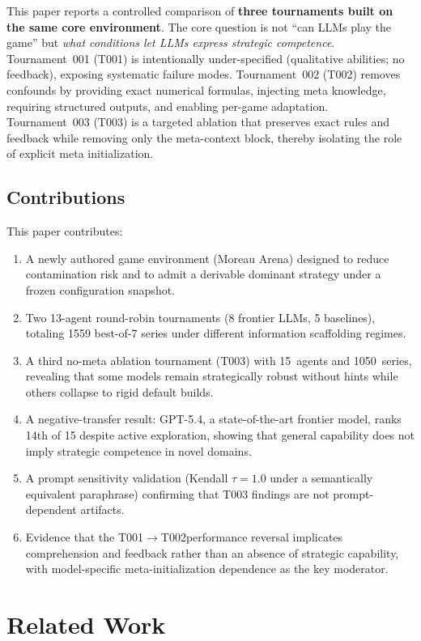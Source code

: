 \documentclass[11pt]{article}
\newcommand{\tOne}{T001}
\newcommand{\tTwo}{T002}
\newcommand{\tThree}{T003}
\begin{document}
This paper reports a controlled comparison of \textbf{three tournaments built on the same core environment}.
The core question is not ``can LLMs play the game'' but \emph{what conditions let LLMs express strategic competence}.
Tournament~001 (\tOne) is intentionally under-specified (qualitative abilities; no feedback), exposing systematic failure modes.
Tournament~002 (\tTwo) removes confounds by providing exact numerical formulas, injecting meta knowledge, requiring structured outputs, and enabling per-game adaptation.
Tournament~003 (\tThree) is a targeted ablation that preserves exact rules and feedback while removing only the meta-context block, thereby isolating the role of explicit meta initialization.

\subsection*{Contributions}

This paper contributes:
\begin{enumerate}[leftmargin=*]
\item A newly authored game environment (Moreau Arena) designed to reduce contamination risk and to admit a derivable dominant strategy under a frozen configuration snapshot.
\item Two 13-agent round-robin tournaments (8 frontier LLMs, 5 baselines), totaling 1559 best-of-7 series under different information scaffolding regimes.
\item A third no-meta ablation tournament (\tThree) with 15~agents and 1050~series, revealing that some models remain strategically robust without hints while others collapse to rigid default builds.
\item A negative-transfer result: GPT-5.4, a state-of-the-art frontier model, ranks 14th of 15 despite active exploration, showing that general capability does not imply strategic competence in novel domains.
\item A prompt sensitivity validation (Kendall $\tau=1.0$ under a semantically equivalent paraphrase) confirming that \tThree{} findings are not prompt-dependent artifacts.
\item Evidence that the \tOne$\to$\tTwo performance reversal implicates comprehension and feedback rather than an absence of strategic capability, with model-specific meta-initialization dependence as the key moderator.
\end{enumerate}

\section{Related Work}
\end{document}

